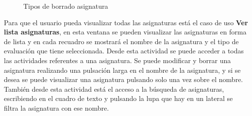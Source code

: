 \begin{figure}[H]
 \centering
 \caption{Tipos de borrado asignatura}
 \label{f:Tipos de borrado asignatura}
\end{figure}

Para que el usuario pueda visualizar todas las asignaturas está el caso de uso \textbf{Ver lista asignaturas}, en esta ventana se pueden visualizar las asignaturas en forma de lista y en cada recuadro se mostrará el nombre de la asignatura y el tipo de evaluación que tiene seleccionada.
Desde esta actividad se puede acceder a todas las actividades referentes a una asignatura. Se puede modificar y borrar una asignatura realizando una pulsación larga en el nombre de la asignatura, y si se desea se puede visualizar una asignatura pulsando solo una vez sobre el nombre.
También desde esta actividad está el acceso a la búsqueda de asignaturas, escribiendo en el cuadro de texto y pulsando la lupa que hay en un lateral se filtra la asignatura con ese nombre.


